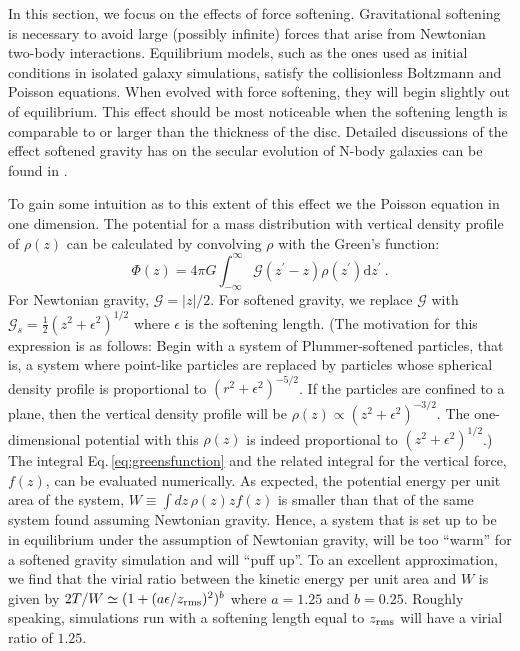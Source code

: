 In this section, we focus on the effects of force softening. {Gravitational
softening is necessary to avoid large (possibly infinite) forces that arise
from Newtonian two-body interactions. }
Equilibrium models, such as the ones used as initial conditions in
isolated galaxy simulations, satisfy the collisionless Boltzmann and
Poisson equations.  When evolved with force softening, they will begin
slightly out of equilibrium.  This effect should be most noticeable
when the softening length is comparable to or larger than the
thickness of the disc. {Detailed discussions of the 
effect softened gravity has on the secular evolution of N-body galaxies can be found in
\citet{romeo_1994,AthanassoulaSellwood1986,merritt_1996,weinberg_1996, romeo_1997, romeo_1998}.}

To gain some intuition as to this extent of
this effect we the Poisson equation in one dimension.  The potential
for a mass distribution with vertical density profile of $\rho(z)$ can
be calculated by convolving $\rho$ with the Green's function:
\begin{equation}\label{eq:greensfunction}
\Phi(z)= 4\pi G\int_{-\infty}^{\infty} \mathcal{G}(z^\prime - z)
\rho(z^\prime) \text{d} z^\prime~.
\end{equation}
For Newtonian gravity, $\mathcal{G} = |z|/2$.  For softened gravity,
we replace $\mathcal{G}$ with $\mathcal{G}_s = \frac{1}{2}\left (z^2 +
\epsilon^2\right )^{1/2}$ where $\epsilon$ is the softening length.
(The motivation for this expression is as follows: Begin with a system
of Plummer-softened particles, that is, a system where point-like
particles are replaced by particles whose spherical density profile is
proportional to $\left (r^2 + \epsilon^2\right )^{-5/2}$.  If the
particles are confined to a plane, then the vertical density profile
will be $\rho(z)\propto \left (z^2 + \epsilon^2\right )^{-3/2}$.  The
one-dimensional potential with this $\rho(z)$ is indeed proportional
to $\left (z^2 + \epsilon^2\right )^{1/2}$.)  The integral
Eq.\,\ref{eq:greensfunction} and the related integral for the vertical
force, $f(z)$, can be evaluated numerically.  As expected, the
potential energy per unit area of the system, $W \equiv \int
dz\,\rho(z) z f(z)$ is smaller than that of the same system found
assuming Newtonian gravity.  Hence, a system that is set up to be in
equilibrium under the assumption of Newtonian gravity, will be too
``warm'' for a softened gravity simulation and will ``puff up''.  To
an excellent approximation, we find that the virial ratio between the
kinetic energy per unit area and $W$ is given by $2T/W \simeq (1 +
(a\epsilon/z_{\rm rms})^2)^{b}$ where $a = 1.25$ and $b = 0.25$.  Roughly
speaking, simulations run with a softening length equal to $z_{\rm rms}$
will have a virial ratio of $1.25$.

